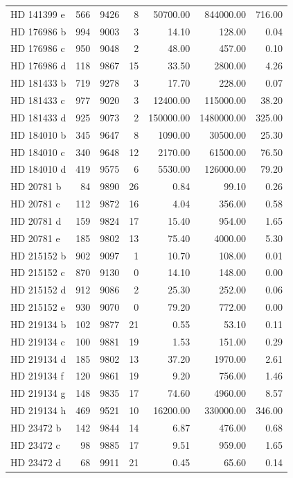 \begin{table}
\begin{tabular}{lrrrrrr}
HD 141399 e & 566 & 9426 & 8 & 50700.00 & 844000.00 & 716.00 \\
HD 176986 b & 994 & 9003 & 3 & 14.10 & 128.00 & 0.04 \\
HD 176986 c & 950 & 9048 & 2 & 48.00 & 457.00 & 0.10 \\
HD 176986 d & 118 & 9867 & 15 & 33.50 & 2800.00 & 4.26 \\
HD 181433 b & 719 & 9278 & 3 & 17.70 & 228.00 & 0.07 \\
HD 181433 c & 977 & 9020 & 3 & 12400.00 & 115000.00 & 38.20 \\
HD 181433 d & 925 & 9073 & 2 & 150000.00 & 1480000.00 & 325.00 \\
HD 184010 b & 345 & 9647 & 8 & 1090.00 & 30500.00 & 25.30 \\
HD 184010 c & 340 & 9648 & 12 & 2170.00 & 61500.00 & 76.50 \\
HD 184010 d & 419 & 9575 & 6 & 5530.00 & 126000.00 & 79.20 \\
HD 20781 b & 84 & 9890 & 26 & 0.84 & 99.10 & 0.26 \\
HD 20781 c & 112 & 9872 & 16 & 4.04 & 356.00 & 0.58 \\
HD 20781 d & 159 & 9824 & 17 & 15.40 & 954.00 & 1.65 \\
HD 20781 e & 185 & 9802 & 13 & 75.40 & 4000.00 & 5.30 \\
HD 215152 b & 902 & 9097 & 1 & 10.70 & 108.00 & 0.01 \\
HD 215152 c & 870 & 9130 & 0 & 14.10 & 148.00 & 0.00 \\
HD 215152 d & 912 & 9086 & 2 & 25.30 & 252.00 & 0.06 \\
HD 215152 e & 930 & 9070 & 0 & 79.20 & 772.00 & 0.00 \\
HD 219134 b & 102 & 9877 & 21 & 0.55 & 53.10 & 0.11 \\
HD 219134 c & 100 & 9881 & 19 & 1.53 & 151.00 & 0.29 \\
HD 219134 d & 185 & 9802 & 13 & 37.20 & 1970.00 & 2.61 \\
HD 219134 f & 120 & 9861 & 19 & 9.20 & 756.00 & 1.46 \\
HD 219134 g & 148 & 9835 & 17 & 74.60 & 4960.00 & 8.57 \\
HD 219134 h & 469 & 9521 & 10 & 16200.00 & 330000.00 & 346.00 \\
HD 23472 b & 142 & 9844 & 14 & 6.87 & 476.00 & 0.68 \\
HD 23472 c & 98 & 9885 & 17 & 9.51 & 959.00 & 1.65 \\
HD 23472 d & 68 & 9911 & 21 & 0.45 & 65.60 & 0.14 \\

\end{tabular}
\end{table}
